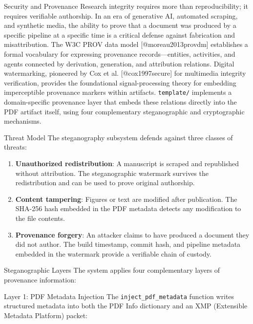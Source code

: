 \documentclass[
  ignorenonframetext,
]{beamer}
\author{\texorpdfstring{}{}}
\date{}
\providecommand{\tightlist}{%
  \setlength{\itemsep}{0pt}\setlength{\parskip}{0pt}}
\begin{document}
\begin{frame}[fragile]{Security and Provenance}
\protect{}\label{security-and-provenance}
Research integrity requires more than reproducibility; it requires
verifiable authorship. In an era of generative AI, automated scraping,
and synthetic media, the ability to prove that a document was produced
by a specific pipeline at a specific time is a critical defense against
fabrication and misattribution. The W3C PROV data model
{[}@moreau2013provdm{]} establishes a formal vocabulary for expressing
provenance records---entities, activities, and agents connected by
derivation, generation, and attribution relations. Digital watermarking,
pioneered by Cox et al. {[}@cox1997secure{]} for multimedia integrity
verification, provides the foundational signal-processing theory for
embedding imperceptible provenance markers within artifacts.
\texttt{template/} implements a domain-specific provenance layer that
embeds these relations directly into the PDF artifact itself, using four
complementary steganographic and cryptographic mechanisms.

\begin{block}{Threat Model}
\protect{}\label{threat-model}
The steganography subsystem defends against three classes of threats:

\begin{enumerate}
\tightlist
\item
  \textbf{Unauthorized redistribution}: A manuscript is scraped and
  republished without attribution. The steganographic watermark survives
  the redistribution and can be used to prove original authorship.
\item
  \textbf{Content tampering}: Figures or text are modified after
  publication. The SHA-256 hash embedded in the PDF metadata detects any
  modification to the file contents.
\item
  \textbf{Provenance forgery}: An attacker claims to have produced a
  document they did not author. The build timestamp, commit hash, and
  pipeline metadata embedded in the watermark provide a verifiable chain
  of custody.
\end{enumerate}
\end{block}

\begin{block}{Steganographic Layers}
\protect{}\label{steganographic-layers}
The system applies four complementary layers of provenance information:

\begin{block}{Layer 1: PDF Metadata Injection}
\protect{}\label{layer-1-pdf-metadata-injection}
The \texttt{inject\_pdf\_metadata} function writes structured metadata
into both the PDF Info dictionary and an XMP (Extensible Metadata
Platform) packet:


\end{block}
\end{block}
\end{frame}
\end{document}
